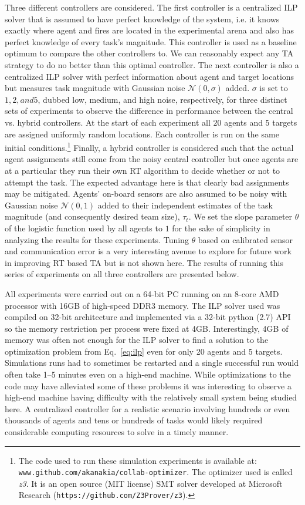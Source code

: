 \documentclass[12pt]{book}
\begin{document}
Three different controllers are considered. The first controller is a centralized ILP solver that is assumed to have perfect knowledge of the system, i.e. it knows exactly where agent and fires are located in the experimental arena and also has perfect knowledge of every task's magnitude. This controller is used as a baseline optimum to compare the other controllers to. We can reasonably expect any TA strategy to do no better than this optimal controller. The next controller is also a centralized ILP solver with perfect information about agent and target locations but measures task magnitude with Gaussian noise $\mathcal{N}(0, \sigma)$ added. $\sigma$ is set to $1, 2, and 5$, dubbed low, medium, and high noise, respectively, for three distinct sets of experiments to observe the difference in performance between the central vs. hybrid controllers. At the start of each experiment all $20$ agents and $5$ targets are assigned uniformly random locations. Each controller is run on the same initial conditions.\footnote{The code used to run these simulation experiments is available at: \texttt{www.github.com/akanakia/collab-optimizer}. The optimizer used is called \emph{z3}. It is an open source (MIT license) SMT solver developed at Microsoft Research (\texttt{https://github.com/Z3Prover/z3}).} Finally, a hybrid controller is considered such that the actual agent assignments still come from the noisy central controller but once agents are at a particular they run their own RT algorithm to decide whether or not to attempt the task. The expected advantage here is that clearly bad assignments may be mitigated. Agents' on-board sensors are also assumed to be noisy with Gaussian noise $\mathcal{N}(0, 1)$ added to their independent estimates of the task magnitude (and consequently desired team size), $\tau_t$. We set the slope parameter $\theta$ of the logistic function used by all agents to $1$ for the sake of simplicity in analyzing the results for these experiments. Tuning $\theta$ based on calibrated sensor and communication error is a very interesting avenue to explore for future work in improving RT based TA but is not shown here. The results of running this series of experiments on all three controllers are presented below.

All experiments were carried out on a 64-bit PC running on an 8-core AMD processor with 16GB of high-speed DDR3 memory. The ILP solver used was compiled on 32-bit architecture and implemented via a 32-bit python (2.7) API so the memory restriction per process were fixed at 4GB. Interestingly, 4GB of memory was often not enough for the ILP solver to find a solution to the optimization problem from Eq.~\ref{eq:ilp} even for only 20 agents and 5 targets. Simulations runs had to sometimes be restarted and a single successful run would often take 1--5 minutes even on a high-end machine. While optimizations to the code may have alleviated some of these problems it was interesting to observe a high-end machine having difficulty with the relatively small system being studied here. A centralized controller for a realistic scenario involving hundreds or even thousands of agents and tens or hundreds of tasks would likely required considerable computing resources to solve in a timely manner.
\end{document}
